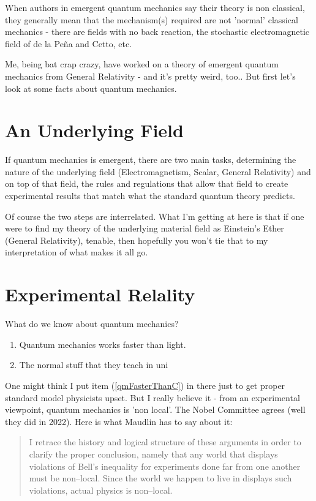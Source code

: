 \documentclass[../rzero]{subfiles}
\begin{document}
When authors in emergent quantum mechanics say their theory is non classical, they generally mean that the mechanism(s) required are not 'normal' classical mechanics - there are fields with no back reaction, the stochastic electromagnetic field of de la Peña and Cetto, etc.

Me, being bat crap crazy, have worked on a theory of emergent quantum mechanics from General Relativity - and it's pretty weird, too.\cite{Andersen2016}. But first let's look at some facts about quantum mechanics.

\section{An Underlying Field}
If quantum mechanics is emergent, there are two main tasks, determining the nature of the underlying field (Electromagnetism, Scalar, General Relativity) and on top of that field, the rules and regulations that allow that field to create experimental results that match what the standard quantum theory predicts. 

Of course the two steps are interrelated. What I'm getting at here is that if one were to find my theory of the underlying material field as Einstein's Ether\cite{Einstein1920} (General Relativity), tenable, then hopefully you won't tie that to my interpretation of what makes it all go. 

\section{Experimental Relality}
What do we know about quantum mechanics?

\begin{enumerate}
	\item{Quantum mechanics works faster than light.}\label{qmFasterThanC}
	\item{The normal stuff that they teach in uni}
\end{enumerate}

One might think I put item (\ref{qmFasterThanC}) in there just to get proper standard model physicists upset. But I really believe it -  from an experimental viewpoint, quantum mechanics is 'non local'. The Nobel Committee agrees\cite{AllNobelPrizes} (well they did in 2022). Here is what Maudlin has to say about it\cite{Maudlind}:

\begin{quotation}
	I retrace the history and logical structure of these arguments in order to clarify the proper conclusion, namely that any world that displays violations of Bell's inequality for experiments done far from one another must be non--local. Since the world we happen to live in displays such violations, actual physics is non--local.
\end{quotation}
\end{document}
